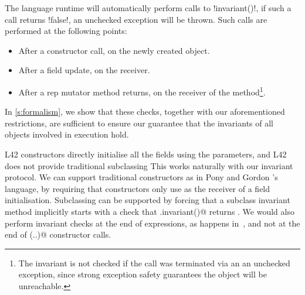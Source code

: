 The language runtime will automatically perform calls to \Q!invariant()!, if such a call returns \Q!false!, an unchecked exception will be thrown. Such calls are performed at the following points:
\begin{itemize}
	\item After a constructor call, on the newly created object.
	\item After a field update, on the receiver.
	\item After a rep mutator method returns, on the receiver of the method\footnote{The invariant is not checked if the call was terminated via an an unchecked exception, since strong exception safety guarantees the object will be unreachable.}.
\end{itemize}
\noindent In \autoref{s:formalism}, we show that these checks, together with our aforementioned restrictions, are sufficient to ensure our guarantee that the invariants of all objects involved in execution hold. %

L42 constructors directly initialise all the fields using the parameters, and L42 does not provide traditional subclassing 
This works naturally with our invariant protocol.
We can support traditional constructors as in Pony and Gordon \etal's language, 
by requiring that constructors only use \Q@this@ as the receiver of a field initialisation.
Subclassing can be supported by forcing that a subclass invariant method implicitly starts with a check that \Q@super.invariant()@ returns \Q@true@. We would also perform invariant checks at the end of \Q@new@ expressions, as happens in~\cite{feldman2006jose}, and not at the end of \Q@super(..)@ constructor calls.
